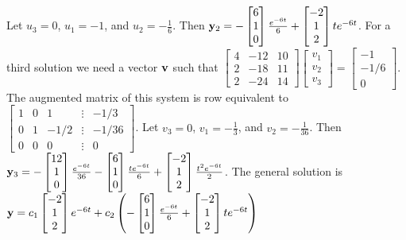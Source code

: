 \documentclass{ximera}
\begin{document}
\begin{problem}
\begin{solution}
Let $u_3=0$, $u_1=-1$, and $u_2=- \frac{1 }{6}$. Then
${\bf y}_2=-\begin{bmatrix}6\\1\\0\end{bmatrix} \frac{e^{-6t} }{6}+\begin{bmatrix}-2\\1\\2\end{bmatrix}te^{-6t}$.
For a third solution we need a vector ${\bf v}$ such that
$ \begin{bmatrix}4&-12&10\\2&-18&11\\2&-24&14\end{bmatrix}\begin{bmatrix}v_1\\v_2\\v_3\end{bmatrix}
= \begin{bmatrix}-1\\-1/6\\0\end{bmatrix}$.
The augmented matrix of this system is row equivalent to
$ \begin{bmatrix}1&0&1&\vdots&-1/3\\0&1&-1/2&
\vdots&-1/36\\0&0&0&\vdots&0\end{bmatrix}$.
Let $v_3=0$, $v_1=- \frac{1 }{3}$, and $v_2=- \frac{1 }{36}$. Then
${\bf y}_3= -\begin{bmatrix}12\\1\\0\end{bmatrix} \frac{e^{-6t} }{36}-\begin{bmatrix}6\\1\\0\end{bmatrix}\frac{t
e^{-6t} }{6}+\begin{bmatrix}-2\\1\\2\end{bmatrix}\frac{t^2e^{-6t} }{2}$.
The general solution is
 ${\bf y}= c_1\begin{bmatrix}-2\\1\\2\end{bmatrix}e^{-6t}+
c_2\left(-\begin{bmatrix}6\\1\\0\end{bmatrix}\frac{e^{-6t} }{6}+\begin{bmatrix}-2\\1\\2\end{bmatrix}te^{-6t}\right)$

\end{solution}
\end{problem}
\end{document}
